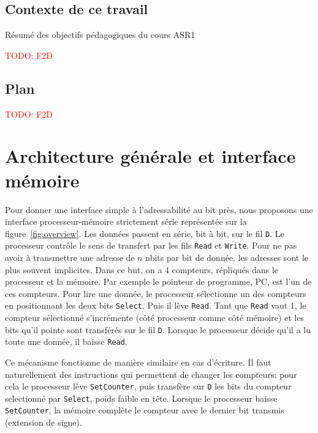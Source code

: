 \documentclass[architecture]{compas2018}
\newcommand{\todo}[1]{\textcolor{red}{TODO: #1}}
\begin{document}
\subsection{Contexte de ce travail}
Résumé des objectifs pédagogiques du cours ASR1

\todo{F2D}
\subsection{Plan}

\todo{F2D}



\section{Architecture générale et interface mémoire}
Pour donner une interface simple à l'adressabilité au bit près, nous proposons une interface processeur-mémoire strictement série représentée sur la figure~\ref{fig:overview}.
Les données passent en série, bit à bit, sur le fil \texttt{D}.
Le processeur contrôle le sens de transfert par les fils \texttt{Read} et \texttt{Write}.
Pour ne pas avoir à transmettre une adresse de $n$ nbits par bit de donnée, les adresses sont le plus souvent implicites.
Dans ce but, on a 4 compteurs, répliqués dans le processeur et la mémoire.
Par exemple le pointeur de programme, PC, est l'un de ces compteurs.
Pour lire une donnée, le processeur sélectionne un des compteurs en positionnant les deux bits  \texttt{Select}.
Puis il lève \texttt{Read}.
Tant que \texttt{Read} vaut 1, le compteur sélectionné s'incrémente (côté processeur comme côté mémoire) et les bits qu'il pointe sont transférés sur le fil \texttt{D}.
Lorsque le processeur décide qu'il a lu toute une donnée, il baisse \texttt{Read}.

Ce mécanisme fonctionne de manière similaire en cas d'écriture.
Il faut naturellement des instructions qui permettent de changer les compteurs: pour cela le processeur lève \texttt{SetCounter}, puis transfère sur \texttt{D} les bits du compteur selectionné par \texttt{Select}, poids faible en tête.
Lorsque le processeur baisse \texttt{SetCounter}, la mémoire complète le compteur avec le dernier bit transmis (extension de signe).
\end{document}
